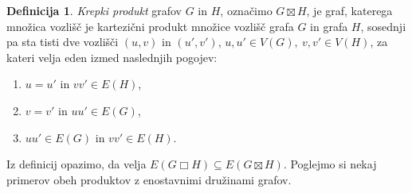 \documentclass[12pt,a4paper,twoside]{article}
\theoremstyle{definition} %
\newtheorem{definicija}{Definicija}[section]
\theoremstyle{plain} %
\numberwithin{equation}{section}  %
\DeclareMathOperator{\boxempty}{\Box}
\begin{document}
\begin{definicija}
    \emph{Krepki produkt} grafov $G$ in $H$, označimo $G \boxtimes H$, je graf, katerega  množica vozlišč je kartezični produkt množice vozlišč grafa $G$ in grafa $H$, sosednji pa sta tisti dve vozlišči $(u, v)$ in $(u', v')$, $u, u' \in V(G),\ v, v' \in V(H)$, za kateri velja eden izmed naslednjih pogojev:
    \begin{enumerate}
        \item $u = u'$ in $vv' \in E(H)$,
        \item $v = v'$ in $uu' \in E(G)$,
        \item $uu' \in E(G)$ in $vv' \in E(H)$.
    \end{enumerate}
\end{definicija}

Iz definicij opazimo, da velja $E(G \boxempty H) \subseteq E(G \boxtimes H)$. Poglejmo si  nekaj primerov obeh produktov z enostavnimi družinami grafov.
\end{document}
